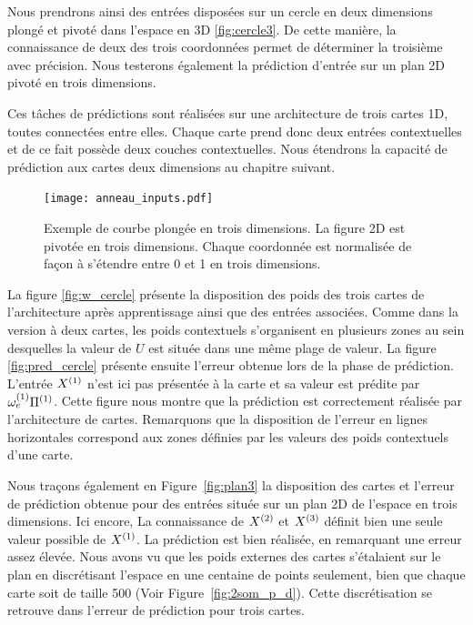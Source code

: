 \documentclass[../main]{subfiles}
\begin{document}
Nous prendrons ainsi des entrées disposées sur un cercle en deux dimensions plongé et pivoté dans l'espace en 3D \ref{fig:cercle3}. De cette manière, la connaissance de deux des trois coordonnées permet de déterminer la troisième avec précision. Nous testerons également la prédiction d'entrée sur un plan 2D pivoté en trois dimensions.

Ces tâches de prédictions sont réalisées sur une architecture de trois cartes 1D, toutes connectées entre elles. Chaque carte prend donc deux entrées contextuelles et de ce fait possède deux couches contextuelles.
Nous étendrons la capacité de prédiction aux cartes deux dimensions au chapitre suivant.

\begin{figure}
	\centering\texttt{[image: anneau\_inputs.pdf]}
	\caption{Exemple de courbe plongée en trois dimensions. La figure 2D est pivotée en trois dimensions. Chaque coordonnée est normalisée de façon à s'étendre entre 0 et 1 en trois dimensions.
	\label{fig:in_3D}}
\end{figure}

La figure \ref{fig:w_cercle} présente la disposition des poids des trois cartes de l'architecture après apprentissage ainsi que des entrées associées. 
Comme dans la version à deux cartes, les poids contextuels s'organisent en plusieurs zones au sein desquelles la valeur de $U$ est située dans une même plage de valeur. 
La figure \ref{fig:pred_cercle} présente ensuite l'erreur obtenue lors de la phase de prédiction. L'entrée $X^{({1})}$ n'est ici pas présentée à la carte et sa valeur est prédite par $\omega_{e}^{({1})}{\Pi^{({1})}}$. 
Cette figure nous montre que la prédiction est correctement réalisée par l'architecture de cartes. Remarquons que la disposition de l'erreur en lignes horizontales correspond aux zones définies par les valeurs des poids contextuels d'une carte.

Nous traçons également en Figure~\ref{fig:plan3} la disposition des cartes et l'erreur de prédiction obtenue pour des entrées située sur un plan 2D de l'espace en trois dimensions. Ici encore, La connaissance de $X^{({2})}$ et $X^{({3})}$ définit bien une seule valeur possible de $X^{({1})}$. La prédiction est bien réalisée, en remarquant une erreur assez élevée. Nous avons vu que les poids externes des cartes s'étalaient sur le plan en discrétisant l'espace en une centaine de points seulement, bien que chaque carte soit de taille 500 (Voir Figure~\ref{fig:2som_p_d}). Cette discrétisation se retrouve dans l'erreur de prédiction pour trois cartes.
\end{document}
